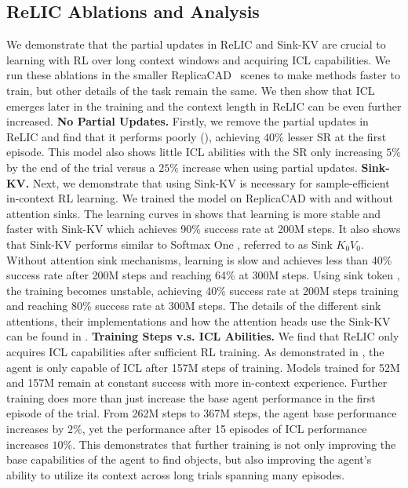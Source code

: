 \documentclass{article}
\newcommand{\method}{ReLIC\xspace}
\newcommand{\sinkv}{Sink-KV\xspace}
\begin{document}
\subsection{\method Ablations and Analysis}
\label{sec:ablation}
\vspace{-5pt}
We demonstrate that the partial updates in \method and \sinkv are crucial to learning with RL over long context windows and acquiring ICL capabilities. We run these ablations in the smaller ReplicaCAD~\citep{szot2021habitat} scenes to make methods faster to train, but other details of the task remain the same.
We then show that ICL emerges later in the training and the context length in \method can be even further increased.
\textbf{No Partial Updates.} Firstly, we remove the partial updates in \method and find that it performs poorly (), achieving $ 40 \%$ lesser SR at the first episode. This model also shows little ICL abilities with the SR only increasing $ 5 \% $ by the end of the trial versus a $ 25\%$ increase when using partial updates.
\textbf{\sinkv.} Next, we demonstrate that using \sinkv is necessary for sample-efficient in-context RL learning. We trained the model on ReplicaCAD with and without attention sinks. The learning curves in  shows that learning is more stable and faster with \sinkv which achieves 90\% success rate at 200M steps. It also shows that \sinkv performs similar to Softmax One \citep{off_by_one_softmax}, referred to as Sink $K_0V_0$.
Without attention sink mechanisms, learning is slow and achieves less than 40\% success rate after 200M steps and reaching 64\% at 300M steps. Using sink token \citep{xiao2023efficient}, the training becomes unstable, achieving 40\% success rate at 200M steps training and reaching 80\% success rate at 300M steps. The details of the different sink attentions, their implementations and how the attention heads use the \sinkv can be found in .
\textbf{Training Steps v.s. ICL Abilities.} We find that \method only acquires ICL capabilities after sufficient RL training. As demonstrated in , the agent is only capable of ICL after 157M steps of training. Models trained for 52M and 157M remain at constant success with more in-context experience. Further training does more than just increase the base agent performance in the first episode of the trial.
From 262M steps to 367M steps, the agent base performance increases by $ 2\%$, yet the performance after 15 episodes of ICL performance increases $ 10 \%$.
This demonstrates that further training is not only improving the base capabilities of the agent to find objects, but also improving the agent's ability to utilize its context across long trials spanning many episodes.
\end{document}
